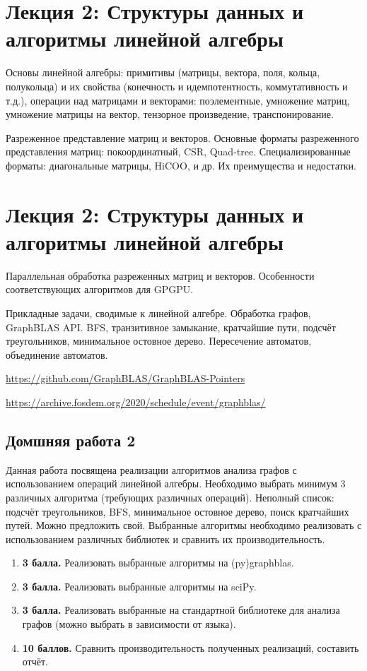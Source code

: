 \section{Лекция 2: Структуры данных и алгоритмы линейной алгебры}


Основы линейной алгебры: примитивы (матрицы,  вектора, поля, кольца, полукольца) и их свойства (конечность и идемпотентность, коммутативность и т.д.), операции над матрицами и векторами: поэлементные, умножение матриц, умножение матрицы на вектор, тензорное произведение, транспонирование.


Разреженное представление матриц и векторов. Основные форматы разреженного представления матриц: покоординатный, CSR, Quad-tree. Специализированные форматы: диагональные матрицы, HiCOO, и др. Их преимущества и недостатки.

\section{Лекция 2: Структуры данных и алгоритмы линейной алгебры}

Параллельная обработка разреженных матриц и векторов. Особенности соответствующих алгоритмов для GPGPU.

Прикладные задачи, сводимые к линейной алгебре. Обработка графов, GraphBLAS API. BFS, транзитивное замыкание, кратчайшие пути, подсчёт треугольников, минимальное остовное дерево. Пересечение автоматов, объединение автоматов.

\url{https://github.com/GraphBLAS/GraphBLAS-Pointers}

\url{https://archive.fosdem.org/2020/schedule/event/graphblas/}

\subsection{Домшняя работа 2}

Данная работа посвящена реализации алгоритмов анализа графов с использованием операций линейной алгебры. Необходимо выбрать минимум 3 различных алгоритма (требующих различных операций). Неполный список: подсчёт треугольников, BFS, минимальное остовное дерево, поиск кратчайших путей. Можно предложить свой. Выбранные алгоритмы необходимо реализовать с использованием различных библиотек и сравнить их производительность.

\begin{enumerate}
   \item \textbf{3 балла.} Реализовать выбранные алгоритмы на (py)graphblas.
   \item \textbf{3 балла.} Реализовать выбранные алгоритмы на sciPy.
   \item \textbf{3 балла.} Реализовать выбранные на стандартной библиотеке для анализа графов (можно выбрать в зависимости от языка).
   \item \textbf{10 баллов.} Сравнить производительность полученных реализаций, составить отчёт.
\end{enumerate}


